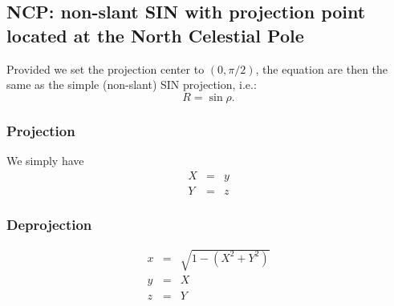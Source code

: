 \subsection{NCP: non-slant SIN with projection point located at the North Celestial Pole}

  Provided we set the projection center to $(0, \pi/2)$, the equation are then the same as
  the simple (non-slant) SIN projection, i.e.:
  \begin{equation}
    R = \sin\rho.
  \end{equation}
  
  \subsubsection{Projection}

    We simply have
    \begin{eqnarray}
      X & = & y \\
      Y & = & z 
    \end{eqnarray}

  \subsubsection{Deprojection}

    \begin{eqnarray}
      x & = & \sqrt{1 - (X^2 + Y^2)} \\
      y & = & X \\
      z & = & Y
    \end{eqnarray}

